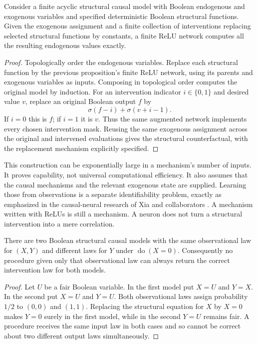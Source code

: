\begin{theorem}
\label{thm:relu-counterfactual}
Consider a finite acyclic structural causal model with Boolean endogenous and exogenous variables and specified deterministic Boolean structural functions. Given the exogenous assignment and a finite collection of interventions replacing selected structural functions by constants, a finite ReLU network computes all the resulting endogenous values exactly.
\end{theorem}
\begin{proof}
Topologically order the endogenous variables. Replace each structural function by the previous proposition's finite ReLU network, using its parents and exogenous variables as inputs. Composing in topological order computes the original model by induction. For an intervention indicator $i\in\{0,1\}$ and desired value $v$, replace an original Boolean output $f$ by
\[
 \sigma(f-i)+\sigma(v+i-1).
\]
If $i=0$ this is $f$; if $i=1$ it is $v$. Thus the same augmented network implements every chosen intervention mask. Reusing the same exogenous assignment across the original and intervened evaluations gives the structural counterfactual, with the replacement mechanism explicitly specified.
\end{proof}

This construction can be exponentially large in a mechanism's number of inputs. It proves capability, not universal computational efficiency. It also assumes that the causal mechanisms and the relevant exogenous state are supplied. Learning those from observations is a separate identifiability problem, exactly as emphasized in the causal-neural research of Xia and collaborators \cite{LLxia}. A mechanism written with ReLUs is still a mechanism. A neuron does not turn a structural intervention into a mere correlation.

\begin{proposition}
There are two Boolean structural causal models with the same observational law for $(X,Y)$ and different laws for $Y$ under $\operatorname{do}(X=0)$. Consequently no procedure given only that observational law can always return the correct intervention law for both models.
\end{proposition}
\begin{proof}
Let $U$ be a fair Boolean variable. In the first model put $X=U$ and $Y=X$. In the second put $X=U$ and $Y=U$. Both observational laws assign probability $1/2$ to $(0,0)$ and $(1,1)$. Replacing the structural equation for $X$ by $X=0$ makes $Y=0$ surely in the first model, while in the second $Y=U$ remains fair. A procedure receives the same input law in both cases and so cannot be correct about two different output laws simultaneously.
\end{proof}

